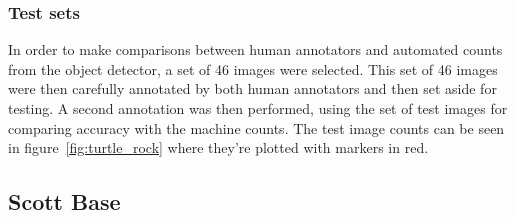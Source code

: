 \subsubsection{Test sets}

In order to make comparisons between human annotators and automated counts from the object detector, a set of 46 images were selected. This set of 46 images were then carefully annotated by both human annotators and then set aside for testing. A second annotation was then performed, using the set of test images for comparing accuracy with the machine counts. The test image counts can be seen in figure~\ref{fig:turtle_rock} where they're plotted with markers in red. 






\subsection{Scott Base \cite{Eisert2019}}

